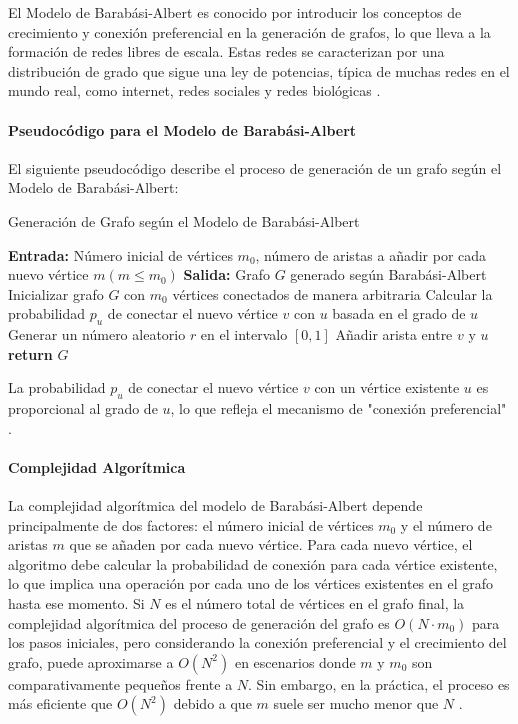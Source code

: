 El Modelo de Barabási-Albert es conocido por introducir los conceptos de crecimiento y conexión preferencial en la generación de grafos, lo que lleva a la formación de redes libres de escala. Estas redes se caracterizan por una distribución de grado que sigue una ley de potencias, típica de muchas redes en el mundo real, como internet, redes sociales y redes biológicas \citep{Barabasi1999} .

\paragraph{Pseudocódigo para el Modelo de Barabási-Albert}

El siguiente pseudocódigo describe el proceso de generación de un grafo según el Modelo de Barabási-Albert:
\newpage

\begin{algorithm}
\caption{Generación de Grafo según el Modelo de Barabási-Albert}
\begin{algorithmic}[1]
\State \textbf{Entrada:} Número inicial de vértices $m_0$, número de aristas a añadir por cada nuevo vértice $m (m \leq m_0)$
\State \textbf{Salida:} Grafo $G$ generado según Barabási-Albert
    \State Inicializar grafo $G$ con $m_0$ vértices conectados de manera arbitraria
            \State Calcular la probabilidad $p_u$ de conectar el nuevo vértice $v$ con $u$ basada en el grado de $u$
            \State Generar un número aleatorio $r$ en el intervalo $[0, 1]$
                \State Añadir arista entre $v$ y $u$
            \EndIf
        \EndFor
    \EndFor
    \State \textbf{return} $G$
\EndProcedure
\end{algorithmic}
\end{algorithm}

La probabilidad $p_u$ de conectar el nuevo vértice $v$ con un vértice existente $u$ es proporcional al grado de $u$, lo que refleja el mecanismo de "conexión preferencial" .

\paragraph{Complejidad Algorítmica}

La complejidad algorítmica del modelo de Barabási-Albert depende principalmente de dos factores: el número inicial de vértices $m_0$ y el número de aristas $m$ que se añaden por cada nuevo vértice. Para cada nuevo vértice, el algoritmo debe calcular la probabilidad de conexión para cada vértice existente, lo que implica una operación por cada uno de los vértices existentes en el grafo hasta ese momento. Si $N$ es el número total de vértices en el grafo final, la complejidad algorítmica del proceso de generación del grafo es $O(N \cdot m_0)$ para los pasos iniciales, pero considerando la conexión preferencial y el crecimiento del grafo, puede aproximarse a $O(N^2)$ en escenarios donde $m$ y $m_0$ son comparativamente pequeños frente a $N$. Sin embargo, en la práctica, el proceso es más eficiente que $O(N^2)$ debido a que $m$ suele ser mucho menor que $N$ .

